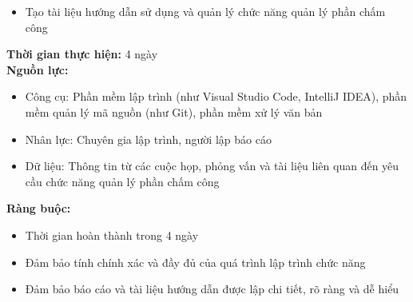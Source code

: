{\begin{minipage}{\textwidth}
\begin{itemize}
        \item Tạo tài liệu hướng dẫn sử dụng và quản lý chức năng quản lý phần chấm công
    \end{itemize}
    \noindent \textbf{Thời gian thực hiện:} 4 ngày \\
    \noindent \textbf{Nguồn lực:}
    \begin{itemize}
        \item Công cụ: Phần mềm lập trình (như Visual Studio Code, IntelliJ IDEA), phần mềm quản lý mã nguồn (như Git), phần mềm xử lý văn bản
        \item Nhân lực: Chuyên gia lập trình, người lập báo cáo
        \item Dữ liệu: Thông tin từ các cuộc họp, phỏng vấn và tài liệu liên quan đến yêu cầu chức năng quản lý phần chấm công
    \end{itemize}
    \noindent \textbf{Ràng buộc:}
    \begin{itemize}
        \item Thời gian hoàn thành trong 4 ngày
        \item Đảm bảo tính chính xác và đầy đủ của quá trình lập trình chức năng
        \item Đảm bảo báo cáo và tài liệu hướng dẫn được lập chi tiết, rõ ràng và dễ hiểu
    \end{itemize}
    \end{minipage}
}
\newpage
{}    
